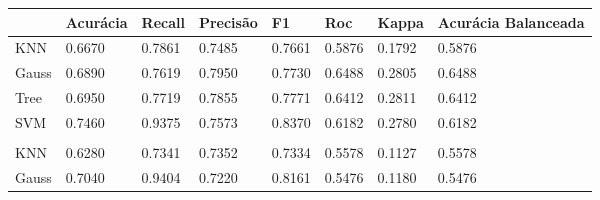 \begin{table}[h]
	\begin{tabular}{|l|l|l|l|l|l|l|l|}
		\hline
		\cellcolor[HTML]{333333}{\color[HTML]{FFFFFF} Cru}         & Acurácia                       & Recall                         & Precisão                       & F1                             & Roc                            & Kappa                          & Acurácia Balanceada            \\ \hline
		KNN                                                        & 0.6670                         & 0.7861                         & 0.7485                         & 0.7661                         & 0.5876                         & 0.1792                         & 0.5876                         \\ \hline
		Gauss                                                      & 0.6890                         & 0.7619                         & \cellcolor[HTML]{32CB00}0.7950 & 0.7730                         & \cellcolor[HTML]{32CB00}0.6488 & 0.2805                         & \cellcolor[HTML]{32CB00}0.6488 \\ \hline
		Tree                                                       & 0.6950                         & 0.7719                         & 0.7855                         & 0.7771                         & 0.6412                         & \cellcolor[HTML]{32CB00}0.2811 & 0.6412                         \\ \hline
		SVM                                                        & \cellcolor[HTML]{32CB00}0.7460 & 0.9375                         & 0.7573                         & \cellcolor[HTML]{32CB00}0.8370 & 0.6182                         & 0.2780                         & 0.6182                         \\ \hline
		\cellcolor[HTML]{333333}{\color[HTML]{FFFFFF} Selecionado} &                                &                                &                                &                                &                                &                                &                                \\ \hline
		KNN                                                        & 0.6280                         & 0.7341                         & 0.7352                         & 0.7334                         & 0.5578                         & 0.1127                         & 0.5578                         \\ \hline
		Gauss                                                      & 0.7040                         & 0.9404                         & 0.7220                         & 0.8161                         & 0.5476                         & 0.1180                         & 0.5476                         \\ \hline

\end{tabular}
\end{table}
